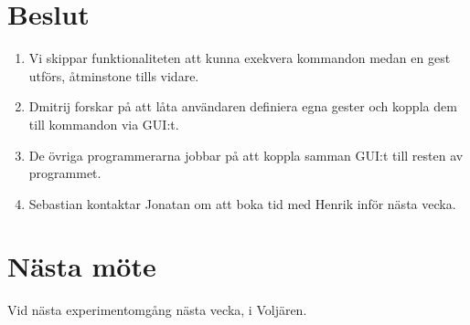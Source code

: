 \documentclass[a4paper,12pt]{article}
\begin{document}
\section{Beslut}
\begin{enumerate}
\item Vi skippar funktionaliteten att kunna exekvera kommandon medan en gest utförs, åtminstone
tills vidare.
\item Dmitrij forskar på att låta användaren definiera egna gester och koppla dem till
kommandon via GUI:t.
\item De övriga programmerarna jobbar på att koppla samman GUI:t till resten av programmet.
\item Sebastian kontaktar Jonatan om att boka tid med Henrik inför nästa vecka.
\end{enumerate}

\section{Nästa möte}
Vid nästa experimentomgång nästa vecka, i Voljären.
\end{document}
